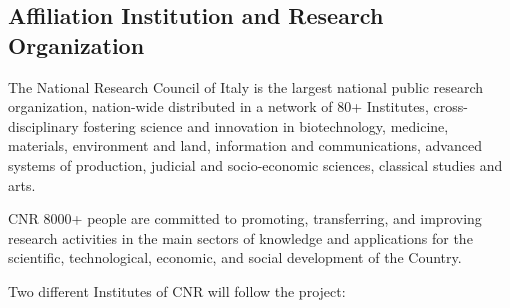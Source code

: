 \subsection{\texorpdfstring{Affiliation Institution and Research
Organization
}{Affiliation Institution and Research Organization }}\label{affiliation-institution-and-research-organization}

The National Research Council of Italy is the largest national public
research organization, nation-wide distributed in a network of 80+
Institutes, cross-disciplinary fostering science and innovation in
biotechnology, medicine, materials, environment and land, information
and communications, advanced systems of production, judicial and
socio-economic sciences, classical studies and arts.

CNR 8000+ people are committed to promoting, transferring, and improving
research activities in the main sectors of knowledge and applications
for the scientific, technological, economic, and social development of
the Country.

Two different Institutes of CNR will follow the project:

